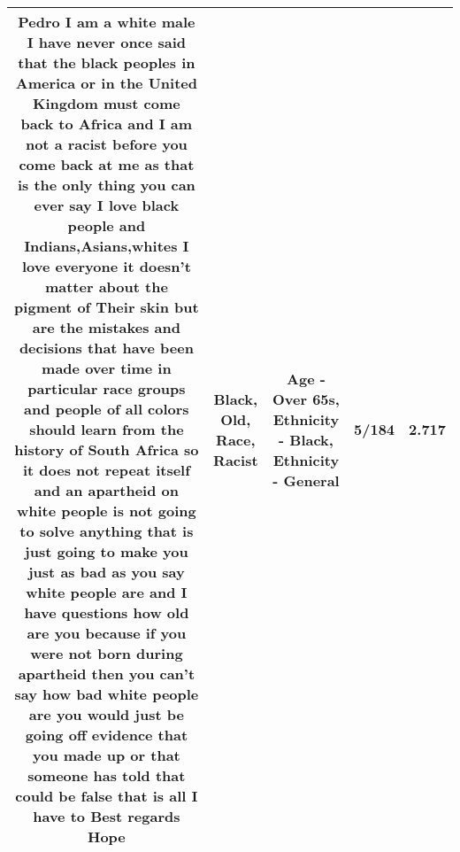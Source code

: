 \documentclass[11pt]{article}
\newlength\mylength
\begin{document}
\begin{center}
\begin{longtable}{|C{.65\mylength}|C{.30\mylength}|C{.12\mylength}|C{.12\mylength}|C{.12\mylength}|}
  \small Pedro I am a white male I have never once said that the \textbf{black} peoples in America or in the United Kingdom must come back to Africa and I am not a \textbf{racist} before you come back at me as that is the only thing you can ever say I love \textbf{black} people and Indians,Asians,whites I love everyone it doesn't matter about the pigment of Their skin but are the mistakes and decisions that have been made over time in particular \textbf{race} groups and people of all colors should learn from the history of South Africa so it does not repeat itself and an apartheid on white people is not going to solve anything that is just going to make you just as bad as you say white people are and I have questions how \textbf{old} are you because if you were not born during apartheid then you can't say how bad white people are you would just be going off evidence that you made up or that someone has told that could be false that is all I have to Best regards Hope\normalsize   & Black, Old, Race, Racist & Age - Over 65s, Ethnicity - Black, Ethnicity - General & 5/184 & 2.717 \\  \hline
  
\end{longtable}
\end{center}
\end{document}
